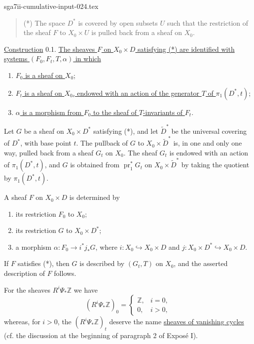 \begin{filecontents*}{sga7ii-cumulative-input-024.tex}
\begin{quote}
(*) The space $D^*$ is covered by open subsets $U$ such that the
restriction of the sheaf $F$ to $X_0\times U$ is pulled back from a sheaf
on $X_0$.
\end{quote}

\underline{Construction} 0.1. \underline{The sheaves $F$ on
$X_0\times D$ satisfying (*) are identified with systems
$(F_0,F_t,T,\alpha)$ in which}
\begin{enumerate}[label=\alph*),leftmargin=2.5em]
\item \underline{$F_0$ is a sheaf on $X_0$};
\item \underline{$F_t$ is a sheaf on $X_0$, endowed with an action of
the generator $T$ of $\pi_1(D^*,t)$};
\item \underline{$\alpha$ is a morphism from $F_0$ to the sheaf of
$T$-invariants of $F_t$}.
\end{enumerate}

Let $G$ be a sheaf on $X_0\times D^*$ satisfying (*), and let
$\widetilde D^*$ be the universal covering of $D^*$, with base point
$t$.  The pullback of $G$ to $X_0\times\widetilde D^*$ is, in one and
only one way, pulled back from a sheaf $G_t$ on $X_0$.  The sheaf $G_t$
is endowed with an action of $\pi_1(D^*,t)$, and $G$ is obtained from
$\operatorname{pr}_1^*G_t$ on $X_0\times\widetilde D^*$ by taking the
quotient by $\pi_1(D^*,t)$.

A sheaf $F$ on $X_0\times D$ is determined by
\begin{enumerate}[label=\arabic*),leftmargin=2.5em]
\item its restriction $F_0$ to $X_0$;
\item its restriction $G$ to $X_0\times D^*$;
\item a morphism $\alpha:F_0\longrightarrow i^*j_*G$, where
$i:X_0\hookrightarrow X_0\times D$ and
$j:X_0\times D^*\hookrightarrow X_0\times D$.
\end{enumerate}
If $F$ satisfies (*), then $G$ is described by $(G_t,T)$ on $X_0$, and
the asserted description of $F$ follows.

For the sheaves $R^i\Psi_*\mathbb Z$ we have
\begin{equation*}
(R^i\Psi_*\mathbb Z)_0=
\begin{cases}
\mathbb Z, & i=0,\\
0, & i>0,
\end{cases}
\end{equation*}
whereas, for $i>0$, the $(R^i\Psi_*\mathbb Z)_t$ deserve the name
\underline{sheaves of vanishing cycles} (cf. the discussion at the
beginning of paragraph 2 of Expos\'e I).


\end{filecontents*}
